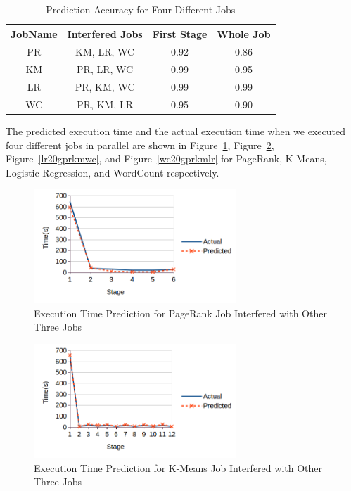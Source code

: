 \begin{table}[!t]
\renewcommand{\arraystretch}{1.3}
\caption{Prediction Accuracy for Four Different Jobs}
\label{table_fourjobs}
\centering
\begin{tabular}{c|c|c|c}
\hline
\bfseries JobName & \bfseries Interfered Jobs & \bfseries First Stage & \bfseries Whole Job\\
\hline\hline
PR & KM, LR, WC & 0.92 & 0.86\\
\hline
KM & PR, LR, WC & 0.99 & 0.95\\
\hline
LR & PR, KM, WC & 0.99 & 0.99 \\
\hline
WC & PR, KM, LR & 0.95 & 0.90\\
\hline
\end{tabular}
\end{table}
The predicted execution time and the actual execution time when we executed four different jobs in parallel are shown in Figure~\ref{pr20gkmlrwc}, Figure~\ref{km20gprlrwc}, Figure~\ref{lr20gprkmwc}, and Figure~\ref{wc20gprkmlr} for PageRank, K-Means, Logistic Regression, and WordCount respectively. 
\begin{figure}[!t]
\centering
\captionsetup{justification=centering}
\includegraphics[width=3in]{figures/pr20g_km_lr_wc.png}
\caption{Execution Time Prediction for PageRank Job Interfered with Other Three Jobs}
\label{pr20gkmlrwc}
\end{figure}
\begin{figure}[!t]
\centering
\captionsetup{justification=centering}
\includegraphics[width=3in]{figures/km20g_pr_lr_wc.png}
\caption{Execution Time Prediction for K-Means Job Interfered with Other Three Jobs}
\label{km20gprlrwc}
\end{figure}
